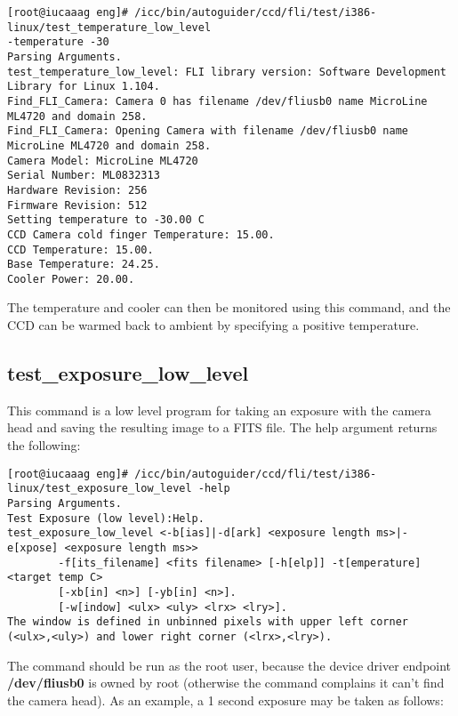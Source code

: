 \documentclass[10pt,a4paper]{article}
\begin{document}
\begin{verbatim}
[root@iucaaag eng]# /icc/bin/autoguider/ccd/fli/test/i386-linux/test_temperature_low_level 
-temperature -30
Parsing Arguments.
test_temperature_low_level: FLI library version: Software Development Library for Linux 1.104.
Find_FLI_Camera: Camera 0 has filename /dev/fliusb0 name MicroLine ML4720 and domain 258.
Find_FLI_Camera: Opening Camera with filename /dev/fliusb0 name MicroLine ML4720 and domain 258.
Camera Model: MicroLine ML4720
Serial Number: ML0832313
Hardware Revision: 256
Firmware Revision: 512
Setting temperature to -30.00 C
CCD Camera cold finger Temperature: 15.00.
CCD Temperature: 15.00.
Base Temperature: 24.25.
Cooler Power: 20.00.
\end{verbatim}

The temperature and cooler can then be monitored using this command, and the CCD can be warmed back to ambient by specifying a positive temperature.

\subsection{test\_exposure\_low\_level}

This command is a low level program for taking an exposure with the camera head and saving the resulting image to a FITS file. The help argument returns the following:

\begin{verbatim}
[root@iucaaag eng]# /icc/bin/autoguider/ccd/fli/test/i386-linux/test_exposure_low_level -help
Parsing Arguments.
Test Exposure (low level):Help.
test_exposure_low_level <-b[ias]|-d[ark] <exposure length ms>|-e[xpose] <exposure length ms>>
        -f[its_filename] <fits filename> [-h[elp]] -t[emperature] <target temp C>
        [-xb[in] <n>] [-yb[in] <n>].
        [-w[indow] <ulx> <uly> <lrx> <lry>].
The window is defined in unbinned pixels with upper left corner (<ulx>,<uly>) and lower right corner (<lrx>,<lry>).
\end{verbatim}

The command should be run as the root user, because the device driver endpoint {\bf /dev/fliusb0} is owned by root (otherwise the command complains it can't find the camera head).
As an example, a 1 second exposure may be taken as follows:
\end{document}
